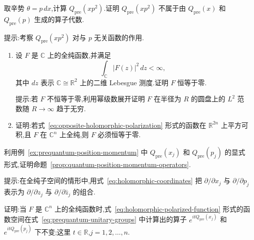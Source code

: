 \begin{exercise}[预量子化的非乘法性]\label{ex:prequantum-nonmultiplicative}
取辛势 $\theta=p\,dx$,计算 $Q_{\mathrm{pre}}(xp^2)$.证明 $Q_{\mathrm{pre}}(xp^2)$ 不属于由 $Q_{\mathrm{pre}}(x)$ 和 $Q_{\mathrm{pre}}(p)$ 生成的算子代数.

提示:考察 $Q_{\mathrm{pre}}(xp^2)$ 对与 $p$ 无关函数的作用.
\end{exercise}

\begin{exercise}[全纯函数的可积性]\label{ex:opposite-holomorphic-l2}
\begin{enumerate}
\item 设 $F$ 是 $\mathbb C$ 上的全纯函数,并满足
\[
 \int_{\mathbb C}|F(z)|^2\,dz<\infty,
\]
其中 $dz$ 表示 $\mathbb C\cong\mathbb R^2$ 上的二维 Lebesgue 测度.证明 $F$ 恒等于零.

提示:若 $F$ 不恒等于零,利用幂级数展开证明 $F$ 在半径为 $R$ 的圆盘上的 $L^2$ 范数随 $R\to\infty$ 趋于无穷.
\item 证明:若式~\eqref{eq:opposite-holomorphic-polarization} 形式的函数在 $\mathbb R^{2n}$ 上平方可积,且 $F$ 在 $\mathbb C^n$ 上全纯,则 $F$ 必须恒等于零.
\end{enumerate}
\end{exercise}

\begin{exercise}[证明三个子空间上的算子公式]\label{ex:prove-prequantum-polarized-operators}
利用例~\ref{ex:prequantum-position-momentum} 中 $Q_{\mathrm{pre}}(x_j)$ 和 $Q_{\mathrm{pre}}(p_j)$ 的显式形式,证明命题~\ref{prop:quantum-position-momentum-operators}.

提示:在全纯子空间的情形中,用式~\eqref{eq:holomorphic-coordinates} 把 $\partial/\partial x_j$ 与 $\partial/\partial p_j$ 表示为 $\partial/\partial z_j$ 与 $\partial/\partial\bar z_j$ 的组合.
\end{exercise}

\begin{exercise}[全纯子空间在指数算子下的不变性]\label{ex:holomorphic-subspace-invariance}
证明:当 $F$ 是 $\mathbb C^n$ 上的全纯函数时,式~\eqref{eq:holomorphic-polarized-function} 形式的函数空间在式~\eqref{eq:prequantum-unitary-groups} 中计算出的算子 $e^{itQ_{\mathrm{pre}}(x_j)}$ 和 $e^{itQ_{\mathrm{pre}}(p_j)}$ 下不变;这里 $t\in\mathbb R$,$j=1,2,\ldots,n$.
\end{exercise}
